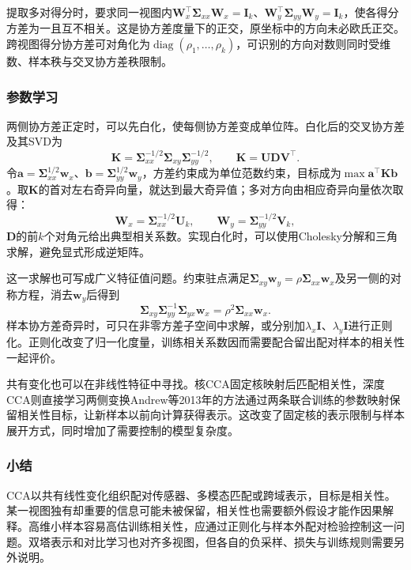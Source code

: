 提取多对得分时，要求同一视图内$\bm{W}_x^{\top}\bm{\Sigma}_{xx}\bm{W}_x=\bm{I}_k$、$\bm{W}_y^{\top}\bm{\Sigma}_{yy}\bm{W}_y=\bm{I}_k$，使各得分方差为一且互不相关。这是协方差度量下的正交，原坐标中的方向未必欧氏正交。跨视图得分协方差可对角化为$\operatorname{diag}(\rho_1,\ldots,\rho_k)$，可识别的方向对数则同时受维数、样本秩与交叉协方差秩限制。

\subsubsection{参数学习}
\label{sec:dim-cca-learning}

两侧协方差正定时，可以先白化，使每侧协方差变成单位阵。白化后的交叉协方差及其SVD为
\[
  \bm{K}=\bm{\Sigma}_{xx}^{-1/2}
               \bm{\Sigma}_{xy}\bm{\Sigma}_{yy}^{-1/2},
  \qquad
  \bm{K}=\bm{U}\bm{D}\bm{V}^{\top}.
\]
令$\bm{a}=\bm{\Sigma}_{xx}^{1/2}\bm{w}_x$、$\bm{b}=\bm{\Sigma}_{yy}^{1/2}\bm{w}_y$，方差约束成为单位范数约束，目标成为$\max\bm{a}^{\top}\bm{K}\bm{b}$。取$\bm{K}$的首对左右奇异向量，就达到最大奇异值；多对方向由相应奇异向量依次取得：
\begin{equation}
  \bm{W}_x=\bm{\Sigma}_{xx}^{-1/2}\bm{U}_k,\qquad
  \bm{W}_y=\bm{\Sigma}_{yy}^{-1/2}\bm{V}_k,
  \label{eq:dim-cca-svd}
\end{equation}
$\bm{D}$的前$k$个对角元给出典型相关系数。实现白化时，可以使用Cholesky分解和三角求解，避免显式形成逆矩阵。

这一求解也可写成广义特征值问题。约束驻点满足$\bm{\Sigma}_{xy}\bm{w}_y=\rho\bm{\Sigma}_{xx}\bm{w}_x$及另一侧的对称方程，消去$\bm{w}_y$后得到
\[
  \bm{\Sigma}_{xy}\bm{\Sigma}_{yy}^{-1}
       \bm{\Sigma}_{yx}\bm{w}_x
  =\rho^2\bm{\Sigma}_{xx}\bm{w}_x.
\]
样本协方差奇异时，可只在非零方差子空间中求解，或分别加$\lambda_x\bm{I}$、$\lambda_y\bm{I}$进行正则化。正则化改变了归一化度量，训练相关系数因而需要配合留出配对样本的相关性一起评价。

共有变化也可以在非线性特征中寻找。核CCA固定核映射后匹配相关性，深度CCA则直接学习两侧变换Andrew等2013年的方法通过两条联合训练的参数映射保留相关性目标，让新样本以前向计算获得表示。这改变了固定核的表示限制与样本展开方式，同时增加了需要控制的模型复杂度。

\subsubsection{小结}
\label{sec:dim-cca-summary}

CCA以共有线性变化组织配对传感器、多模态匹配或跨域表示，目标是相关性。某一视图独有却重要的信息可能未被保留，相关性也需要额外假设才能作因果解释。高维小样本容易高估训练相关性，应通过正则化与样本外配对检验控制这一问题。双塔表示和对比学习也对齐多视图，但各自的负采样、损失与训练规则需要另外说明。

